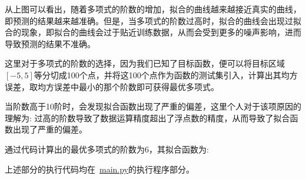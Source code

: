 \documentclass[UTF8]{article} %
\begin{document}
    从上图可以看出，随着多项式的阶数的增加，拟合的曲线越来越接近真实的曲线，即预测的结果越来越准确。但是，当多项式的阶数过高时，拟合的曲线会出现过拟合的现象，即拟合的曲线会过于贴近训练数据，从而会受到更多的噪声影响，进而导致预测的结果不准确。

    这里对于多项式的阶数的选择，因为我们已知了目标函数，便可以将目标区域$[-5, 5]$等分切成100个点，并将这100个点作为函数的测试集引入，计算出其均方误差，取均方误差中最小的那个阶数即可获得最优多项式。

    当阶数高于10阶时，会发现拟合函数出现了严重的偏差，这里个人对于该项原因的理解为: 过高的阶数导致了数据运算精度超出了浮点数的精度，从而导致了拟合函数出现了严重的偏差。

    通过代码计算出的最优多项式的阶数为$6$，其拟合函数为:
    

    上述部分的执行代码均在~\href{run:main.py}{main.py}的执行程序部分。
\end{document}
